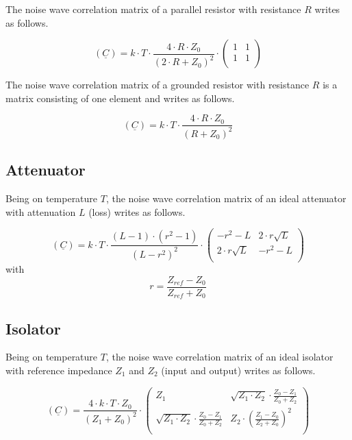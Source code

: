 \documentclass[10pt]{report}
\begin{document}
The noise wave correlation matrix of a parallel resistor with resistance $R$
writes as follows.

\begin{equation}
(\underline{C}) = k\cdot T\cdot\frac{4\cdot R\cdot Z_0}{(2\cdot R+Z_0)^2}\cdot
\begin{pmatrix}
  1 & 1\\
  1 & 1\\
\end{pmatrix}
\end{equation}

The noise wave correlation matrix of a grounded resistor with resistance $R$
is a matrix consisting of one element and writes as follows.

\begin{equation}
(\underline{C}) = k\cdot T\cdot\frac{4\cdot R\cdot Z_0}{(R+Z_0)^2}
\end{equation}


\subsection{Attenuator}

Being on temperature $T$, the noise wave correlation matrix of an
ideal attenuator with attenuation $L$ (loss) writes as follows.

\begin{equation}
(\underline{C}) = k\cdot T\cdot\frac{(L-1)\cdot(r^2-1)}{(L-r^2)^2}\cdot
\begin{pmatrix}
  -r^2-L           & 2\cdot r\sqrt{L}\\
  2\cdot r\sqrt{L} & -r^2-L\\
\end{pmatrix}
\end{equation}
with
\begin{equation}
r=\frac{Z_{ref}-Z_0}{Z_{ref}+Z_0}
\end{equation}


\subsection{Isolator}

Being on temperature $T$, the noise wave correlation matrix of an
ideal isolator with reference impedance $Z_1$ and $Z_2$ (input and
output) writes as follows.

\begin{equation}
(\underline{C}) = \frac{4\cdot k\cdot T\cdot Z_0}{(Z_1+Z_0)^2}\cdot
\begin{pmatrix}
  Z_1           & \sqrt{Z_1\cdot Z_2}\cdot\frac{Z_0-Z_1}{Z_0+Z_2}\\
  \sqrt{Z_1\cdot Z_2}\cdot\frac{Z_0-Z_1}{Z_0+Z_2} & Z_2\cdot\left(\frac{Z_1-Z_0}{Z_2+Z_0}\right)^2\\
\end{pmatrix}
\end{equation}
\end{document}
